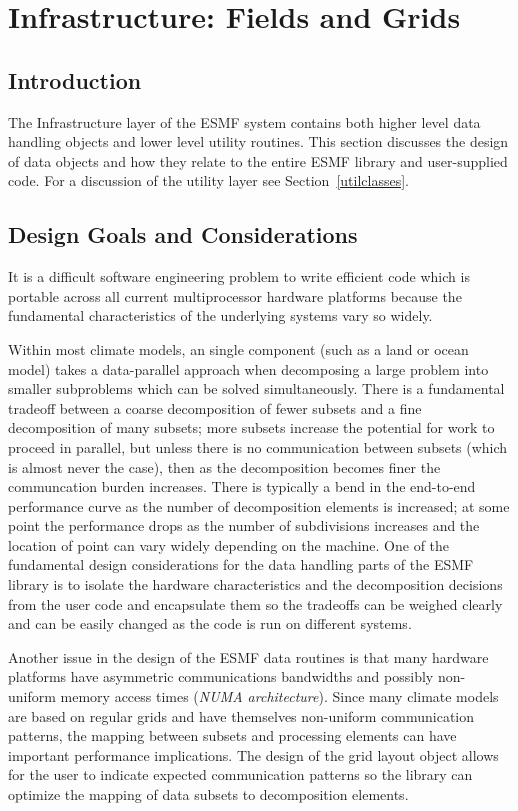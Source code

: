 \section{Infrastructure: Fields and Grids}
\label{sec:fieldclasses}

\subsection{Introduction}

The Infrastructure layer of the ESMF system contains both 
higher level data handling objects and lower level utility routines.
This section discusses the design of data objects and how they relate 
to the entire ESMF library and user-supplied code.  
For a discussion of the utility layer see Section~\ref{utilclasses}.


\subsection{Design Goals and Considerations}

It is a difficult software engineering problem
to write efficient code which is portable across
all current multiprocessor hardware platforms
because the fundamental characteristics of the underlying
systems vary so widely.

Within most climate models, an single component (such as a
land or ocean model) takes a data-parallel approach when 
decomposing a large problem into smaller subproblems which can be 
solved simultaneously.
There is a fundamental tradeoff between a coarse decomposition
of fewer subsets and a fine decomposition of many subsets;
more subsets increase the potential for
work to proceed in parallel, but unless there is 
no communication between subsets (which is
almost never the case), then as the
decomposition becomes finer the communcation burden increases.
There is typically a bend in the end-to-end performance
curve as the number of decomposition elements is increased;
at some point the performance drops as the number of subdivisions
increases and the location of point can vary widely 
depending on the machine.
One of the fundamental design considerations for the data
handling parts of the ESMF library is to isolate the hardware
characteristics and the decomposition decisions from the
user code and encapsulate them so the tradeoffs can be 
weighed clearly and can be easily changed as the code is 
run on different systems.

Another issue in the design of the ESMF data routines is that
many hardware platforms have asymmetric
communications bandwidths and possibly non-uniform memory
access times ({\it NUMA architecture}).
Since many climate models are based on regular grids and
have themselves non-uniform communication patterns, the
mapping between subsets and processing elements can have
important performance implications.  The design of the
grid layout object allows for the user to indicate expected
communication patterns so the library can optimize the
mapping of data subsets to decomposition elements.

